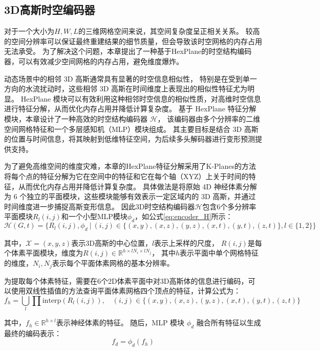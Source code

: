 \subsection{3D高斯时空编码器}
对于一个大小为$H, W, L$的三维网格空间来说，其空间复杂度呈正相关关系。
较高的空间分辨率可以保证最终重建结果的细节质量，但会导致该时空网格的内存占用无法承受。
为了解决这个问题，本章提出了一种基于HexPlane\cite{hex_plane}的时空结构编码器，可以有效减少空间网格的内存占用，避免维度爆炸。

动态场景中的相邻 3D 高斯通常具有显著的时空信息相似性，
特别是在受到单一方向的水流扰动时，这些相邻 3D 高斯在时间维度上表现出的相似性特征尤为明显。
HexPlane 模块可以有效利用这种相邻时空信息的相似性质，对高维时空信息进行特征分解，从而优化内存占用并降低计算复杂度。
基于 HexPlane 特征分解模块，本章设计了一种高效的时空结构编码器 $\mathcal{H}$，
该编码器由多个分辨率的二维空间网格特征和一个多层感知机（MLP）模块组成。
其主要目标是结合 3D 高斯的位置与时间信息，将其映射到低维特征空间，为后续多头解码器进行变形预测提供支持。

为了避免高维空间的维度灾难，本章的HexPlane特征分解采用了K-Planes\cite{k-planes}的方法将每个点的特征分解为它在空间中的特征和它在每个轴（XYZ）上关于时间的特征，从而优化内存占用并降低计算复杂度。
具体做法是将原始 4D 神经体素分解为 6 个独立的平面模块，这些模块能够有效表示一定区域内的 3D 高斯，并通过时间维度进一步捕捉高斯变形信息。
因此3D时空结构编码器$\mathcal{H}$包含6个多分辨率平面模块$R_l(i,j)$和一个小型MLP模块$\phi_d$，如公式\ref{eq:encoder_H}所示：
\begin{equation}
\label{eq:encoder_H}
\mathcal{H}(G, t) = \{ R_l(i,j), \phi_d \ | \ (i,j) \in \{(x,y), (x,z), (y,z), (x,t), (y,t), (z,t)\}, l \in \{1, 2\} \}
\end{equation}

其中，$\mathcal{X} = (x, y, z)$表示3D高斯的中心位置，$l$表示上采样的尺度，
$R(i,j)$是每个体素平面模块，维度为$R(i,j) \in \mathbb{R}^{h \times l N_i \times l N_j}$，
其中$h$表示平面中单个网格特征的维度，$N_i,N_j$表示每个平面体素网格的基本分辨率。

为提取每个体素特征，需要在6个2D体素平面中对3D高斯体的信息进行编码，可以使用双线性插值的方法查询平面体素网格四个顶点的特征，计算公式为：
\begin{equation}
f_h = \bigcup_l \prod \text{interp}(R_l(i,j)), \quad (i,j) \in \{(x,y),(x,z),(y,z),(x,t),(y,t),(z,t)\}
\end{equation}

其中，$f_h \in \mathbb{R}^{h \times l}$表示神经体素的特征。
随后，MLP 模块 $\phi_d$ 融合所有特征以生成最终的编码表示：
\begin{equation}
f_d = \phi_d(f_h)
\end{equation}  

